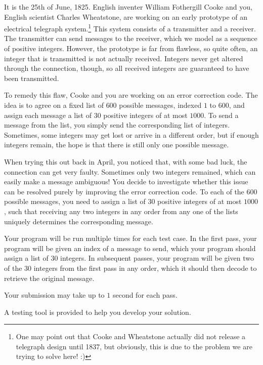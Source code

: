 






It is the 25th of June, 1825.
English inventer William Fothergill Cooke and you, English scientist Charles Wheatstone, are working on an early prototype of an electrical telegraph system.\footnote{
    One may point out that Cooke and Wheatstone actually did not release a telegraph design until 1837,
    but obviously, this is due to the problem we are trying to solve here! :)
}
This system consists of a transmitter and a receiver.
The transmitter can send messages to the receiver, which we model as a sequence of positive integers.
However, the prototype is far from flawless, so quite often, an integer that is transmitted is not actually received.
Integers never get altered through the connection, though, so all received integers are guaranteed to have been transmitted.

To remedy this flaw, Cooke and you are working on an error correction code.
The idea is to agree on a fixed list of $600$ possible messages, indexed $1$ to $600$, and assign each message a list of $30$ positive integers of at most $1000$.
To send a message from the list, you simply send the corresponding list of integers.
Sometimes, some integers may get lost or arrive in a different order,
but if enough integers remain, the hope is that there is still only one possible message.

When trying this out back in April, you noticed that, with some bad luck, the connection can get very faulty.
Sometimes only two integers remained, which can easily make a message ambiguous!
You decide to investigate whether this issue can be resolved purely by improving the error correction code.
To each of the $600$ possible messages, you need to assign a list of $30$ positive integers of at most $1000$,
such that receiving any two integers in any order from any one of the lists uniquely determines the corresponding message.

Your program will be run multiple times for each test case.
In the first pass, your program will be given an index of a message to send, which your program should assign a list of $30$ integers.
In subsequent passes, your program will be given two of the $30$ integers from the first pass in any order,
which it should then decode to retrieve the original message.

Your submission may take up to $1$ second for each pass.

A testing tool is provided to help you develop your solution.

\pagebreak

